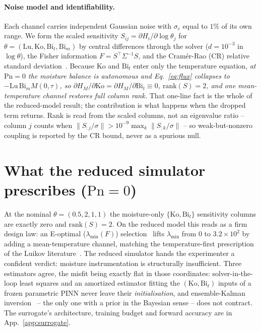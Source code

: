 \documentclass{article}
\begin{document}
\paragraph{Noise model and identifiability.} Each channel carries independent Gaussian noise with
$\sigma_c$ equal to $1\%$ of its own range. We form the scaled sensitivity $S_{ij}=\partial H_i/\partial\log\theta_j$ for
$\theta=(\mathrm{Lu},\mathrm{Ko},\mathrm{Bi}_t,\mathrm{Bi}_m)$ by central differences through the
solver ($d{=}10^{-3}$ in $\log\theta$), the Fisher information $F=S^\top\Sigma^{-1}S$, and the Cram\'er-Rao (CR) relative standard
deviation~\cite{kay1993}. Because $\mathrm{Ko}$ and $\mathrm{Bi}_t$ enter only the temperature
equation, \emph{at $\mathrm{Pn}{=}0$ the moisture balance is autonomous and Eq.~\ref{eq:flux}
collapses to $-\mathrm{Lu}\,\mathrm{Bi}_m M(0,\tau)$, so
$\partial H_M/\partial\mathrm{Ko}=\partial H_M/\partial\mathrm{Bi}_t\equiv 0$, $\mathrm{rank}(S)=2$,
and one mean-temperature channel restores full column rank.} That one-line fact is the whole of the
reduced-model result; the contribution is what happens when the dropped term returns. Rank is read from the
scaled columns, not an eigenvalue ratio -- column $j$ counts when
$\|S_{:j}/\sigma\|>10^{-9}\max_k\|S_{:k}/\sigma\|$ -- so weak-but-nonzero coupling is reported by the
CR bound, never as a spurious null.

\section{What the reduced simulator prescribes ($\mathrm{Pn}{=}0$)}\label{sec:phantom}
At the nominal $\theta{=}(0.5,2,1,1)$ the moisture-only $\{\mathrm{Ko},\mathrm{Bi}_t\}$ sensitivity
columns are exactly zero and $\mathrm{rank}(S)=2$. On the reduced model this reads as a firm design
law: an E-optimal ($\lambda_{\min}(F)$) selection~\cite{pukelsheim2006} lifts $\lambda_{\min}$ from
$0$ to $3.2{\times}10^{2}$ by adding a mean-temperature channel, matching the temperature-first
prescription of the Luikov literature~\cite{dantas2002,bensefia2011}. The reduced simulator hands the
experimenter a confident
verdict: moisture instrumentation is structurally insufficient. Three estimators agree, the misfit
being exactly flat in those coordinates: solver-in-the-loop least squares and an amortized estimator
fitting the $(\mathrm{Ko},\mathrm{Bi}_t)$ inputs of a frozen parametric PINN never leave their
\emph{initialisation}, and ensemble-Kalman inversion~\cite{iglesias2013eki} -- the only one with a
prior in the Bayesian sense -- does not contract. The surrogate's architecture, training budget and
forward accuracy are in App.~\ref{app:surrogate}.
\end{document}
